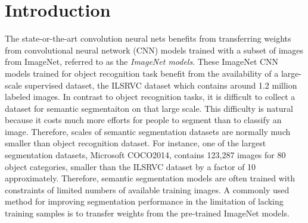 \section{Introduction}
\label{introduction}



The state-or-the-art convolution neural nets benefits from transferring weights from convolutional neural network (CNN) models trained with a subset of images from ImageNet, referred to as the \textit{ImageNet models}.\cite{long2015fully,chen2016deeplab,he2017mask}
These ImageNet CNN models\cite{krizhevsky2012imagenet,simonyan2014very,szegedy2015going,he2016deep} trained for object recognition task benefit from the availability of a large-scale supervised dataset, the ILSRVC dataset\cite{russakovsky2015imagenet} which contains around 1.2 million labeled images.
In contrast to object recognition tasks, it is difficult to collect a dataset for semantic segmentaiton on that large scale.
This difficulty is natural because it costs much more efforts for people to segment than to classify an image.
Therefore, scales of semantic segmentation datasets are normally much smaller than object recognition dataset.
For instance, one of the largest segmentation datasets, Microsoft COCO2014\cite{lin2014microsoft}, contains 123,287 images for 80 object categories, smaller than the ILSRVC dataset by a factor of 10 approximately.
Therefore, semantic segmentation models are often trained with constraints of limited numbers of available training images.
A commonly used method for improving segmentation performance in the limitation of lacking training samples is to transfer weights from the pre-trained ImageNet models.\cite{long2015fully,chen2016deeplab}


